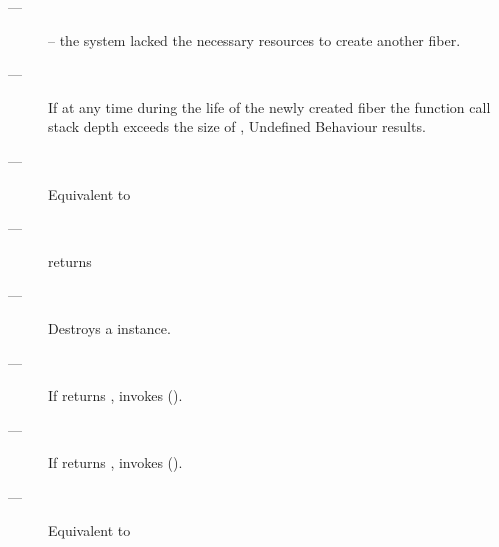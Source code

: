 \errors
\begin{description}
    \item[---]  -- the system lacked the necessary resources to create another fiber.
\end{description}

\remarks
\begin{description}
    \item[---] If at any time during the life of the newly created fiber the
          function call stack depth exceeds the size of , Undefined
          Behaviour results.
\end{description}


\begin{description}
    \item[---] Equivalent to 
\end{description}

\postcond
\begin{description}
    \item[---] \emptyfn returns \true
\end{description}


\effects
\begin{description}
    \item[---] Destroys a \fiber instance.
    \item[---] If \emptyfn returns \false, invokes  ().
\end{description}



\effects
\begin{description}
    \item[---] If \emptyfn returns \false, invokes  ().
    \item[---] Equivalent to 
\end{description}

